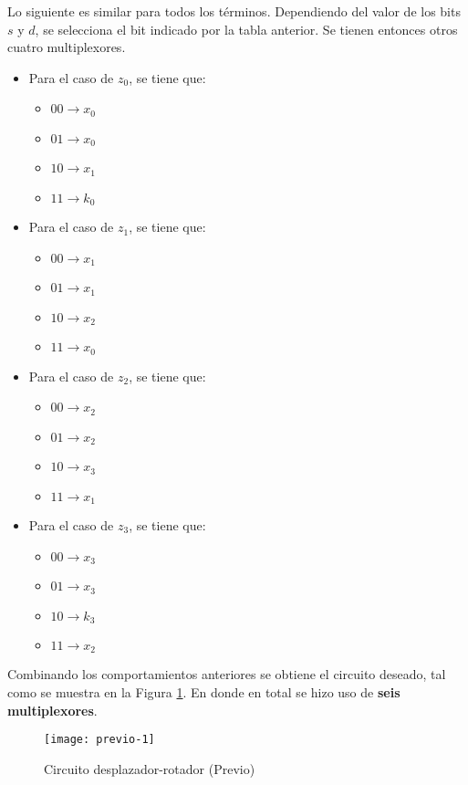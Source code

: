 \documentclass[../procedimientos.tex]{subfiles}
\begin{document}
Lo siguiente es similar para todos los términos. Dependiendo del valor de los 
bits $s$ y $d$, se selecciona el bit indicado por la tabla anterior. Se tienen 
entonces otros cuatro multiplexores.
\begin{itemize}
  \item Para el caso de $z_0$, se tiene que:
    \begin{itemize}
      \item $00 \rightarrow x_0$
      \item $01 \rightarrow x_0$
      \item $10 \rightarrow x_1$
      \item $11 \rightarrow k_0$
    \end{itemize}
  \item Para el caso de $z_1$, se tiene que:
    \begin{itemize}
      \item $00 \rightarrow x_1$
      \item $01 \rightarrow x_1$
      \item $10 \rightarrow x_2$
      \item $11 \rightarrow x_0$
    \end{itemize}
  \item Para el caso de $z_2$, se tiene que:
    \begin{itemize}
      \item $00 \rightarrow x_2$
      \item $01 \rightarrow x_2$
      \item $10 \rightarrow x_3$
      \item $11 \rightarrow x_1$
    \end{itemize}
  \item Para el caso de $z_3$, se tiene que:
    \begin{itemize}
      \item $00 \rightarrow x_3$
      \item $01 \rightarrow x_3$
      \item $10 \rightarrow k_3$
      \item $11 \rightarrow x_2$
    \end{itemize}
\end{itemize}

Combinando los comportamientos anteriores se obtiene el circuito deseado, tal 
como se muestra en la Figura \ref{fig:previo1}. En donde en total se hizo uso 
de \textbf{seis multiplexores}.
\begin{figure}[H]
  \centering
  \texttt{[image: previo-1]}
  \caption{Circuito desplazador-rotador (Previo)}
  \label{fig:previo1}
\end{figure}
\end{document}

